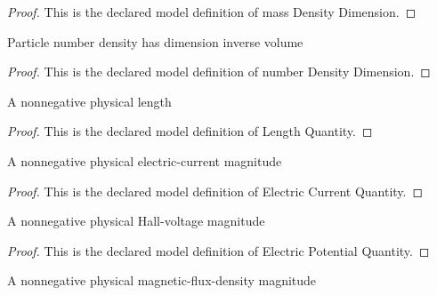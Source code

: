 \begin{proof}
  This is the declared model definition of mass Density Dimension.
\end{proof}
\begin{definition}
  \label{def:physics:phyx-mini-0626:phyxminiproblems-problemphyxmini0626-numberdensitydimension}
  Particle number density has dimension inverse volume
\end{definition}
\begin{proof}
  This is the declared model definition of number Density Dimension.
\end{proof}
\begin{definition}
  \label{def:physics:phyx-mini-0626:phyxminiproblems-problemphyxmini0626-lengthquantity}
  A nonnegative physical length
\end{definition}
\begin{proof}
  This is the declared model definition of Length Quantity.
\end{proof}
\begin{definition}
  \label{def:physics:phyx-mini-0626:phyxminiproblems-problemphyxmini0626-electriccurrentquantity}
  A nonnegative physical electric-current magnitude
\end{definition}
\begin{proof}
  This is the declared model definition of Electric Current Quantity.
\end{proof}
\begin{definition}
  \label{def:physics:phyx-mini-0626:phyxminiproblems-problemphyxmini0626-electricpotentialquantity}
  A nonnegative physical Hall-voltage magnitude
\end{definition}
\begin{proof}
  This is the declared model definition of Electric Potential Quantity.
\end{proof}
\begin{definition}
  \label{def:physics:phyx-mini-0626:phyxminiproblems-problemphyxmini0626-magneticfluxdensityquantity}
  A nonnegative physical magnetic-flux-density magnitude
\end{definition}
